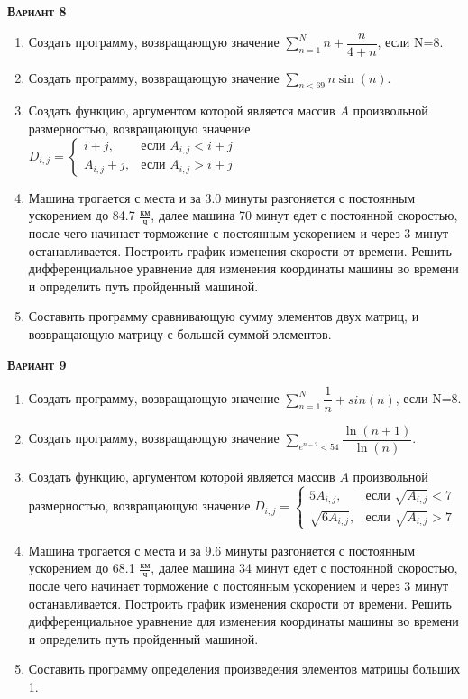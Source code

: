 \textsc{\textbf{Вариант 8}}
\begin{enumerate}
\item  Создать программу, возвращающую значение $\sum\limits_{n=1}^{N} n+\dfrac{n}{4+n}              $, если N=8. 
\item  Создать программу, возвращающую значение $\sum\limits_{n<        69} {n \sin(n)}                   $. 
\item Создать функцию, аргументом которой является массив $A$ произвольной размерностью, возвращающую значение $D_{i,j}=\begin{cases} i+j, & \text{если } {A_{i,j}}<i+j \\  A_{i,j}+j, & \text{если } {A_{i,j}}>i+j \end{cases}                              $ 
\item Машина трогается с места и за  3.0 минуты разгоняется с постоянным ускорением до 84.7 ${\frac{км}{ч}}$, далее машина   70 минут едет с постоянной скоростью, после чего начинает торможение с постоянным ускорением и через   3 минут останавливается. Построить график изменения скорости от времени. Решить дифференциальное уравнение для изменения координаты машины во времени и определить путь пройденный машиной.  \item Составить программу сравнивающую сумму элементов двух матриц, и возвращающую матрицу с большей суммой элементов.                                                                                                    

\end{enumerate}
\textsc{\textbf{Вариант 9}}
\begin{enumerate}
\item  Создать программу, возвращающую значение $\sum\limits_{n=1}^{N} {\dfrac{1}{n} +sin(n)}        $, если N=8. 
\item  Создать программу, возвращающую значение $\sum\limits_{e^{n-2}<  54} \dfrac{\ln(n+1)}{\ln(n)}      $. 
\item Создать функцию, аргументом которой является массив $A$ произвольной размерностью, возвращающую значение $D_{i,j}=\begin{cases} 5 A_{i,j}, & \text{если } \sqrt{A_{i,j}}<7 \\ \sqrt{ 6 A_{i,j}}, & \text{если } \sqrt{A_{i,j}}>7 \end{cases}           $ 
\item Машина трогается с места и за  9.6 минуты разгоняется с постоянным ускорением до 68.1 ${\frac{км}{ч}}$, далее машина   34 минут едет с постоянной скоростью, после чего начинает торможение с постоянным ускорением и через   3 минут останавливается. Построить график изменения скорости от времени. Решить дифференциальное уравнение для изменения координаты машины во времени и определить путь пройденный машиной.  \item Составить программу определения произведения элементов матрицы больших 1.                                                                                                                                                                            

\end{enumerate}
